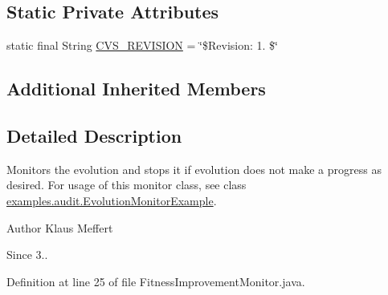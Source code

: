 \subsection*{Static Private Attributes}
\begin{DoxyCompactItemize}
\item 
static final String \hyperlink{classorg_1_1jgap_1_1audit_1_1_fitness_improvement_monitor_a5daafc482d22d150f131c24ca77bb266}{C\-V\-S\-\_\-\-R\-E\-V\-I\-S\-I\-O\-N} = \char`\"{}\$Revision\-: 1. \$\char`\"{}
\end{DoxyCompactItemize}
\subsection*{Additional Inherited Members}


\subsection{Detailed Description}
Monitors the evolution and stops it if evolution does not make a progress as desired. For usage of this monitor class, see class \hyperlink{classexamples_1_1audit_1_1_evolution_monitor_example}{examples.\-audit.\-Evolution\-Monitor\-Example}.

\begin{DoxyAuthor}{Author}
Klaus Meffert 
\end{DoxyAuthor}
\begin{DoxySince}{Since}
3.. 
\end{DoxySince}


Definition at line 25 of file Fitness\-Improvement\-Monitor.\-java.



